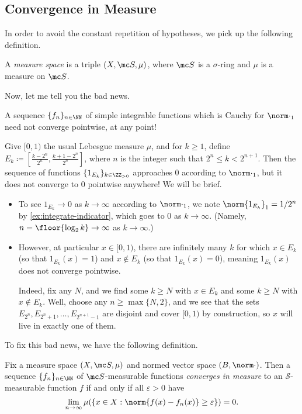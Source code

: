 \documentclass[../notes.tex]{subfiles}
\begin{document}
\subsection{Convergence in Measure}
In order to avoid the constant repetition of hypotheses, we pick up the following definition.
\begin{definition}
	A \textit{measure space} is a triple $(X,\mc S,\mu)$, where $\mc S$ is a $\sigma$-ring and $\mu$ is a measure on $\mc S$.
\end{definition}
Now, let me tell you the bad news.
\begin{warn}
	A sequence $\{f_n\}_{n\in\NN}$ of simple integrable functions which is Cauchy for $\norm\cdot_1$ need not converge pointwise, at any point!
\end{warn}
\begin{example} \label{ex:the-bad-news}
	Give $[0,1)$ the usual Lebesgue measure $\mu$, and for $k\ge1$, define $E_k\coloneqq\left[\frac{k-2^{n}}{2^{n}},\frac{k+1-2^{n}}{2^{n}}\right]$, where $n$ is the integer such that $2^n\le k<2^{n+1}$. Then the sequence of functions $\{1_{E_k}\}_{k\in\ZZ_{>0}}$ approaches $0$ according to $\norm\cdot_1$, but it does not converge to $0$ pointwise anywhere! We will be brief.
	\begin{itemize}
		\item To see $1_{E_k}\to0$ as $k\to\infty$ according to $\norm\cdot_1$, we note $\norm{1_{E_k}}_1=1/2^n$ by \autoref{ex:integrate-indicator}, which goes to $0$ as $k\to\infty$. (Namely, $n=\floor{\log_2k}\to\infty$ as $k\to\infty$.)
		\item However, at particular $x\in[0,1)$, there are infinitely many $k$ for which $x\in E_k$ (so that $1_{E_k}(x)=1$) and $x\notin E_k$ (so that $1_{E_k}(x)=0$), meaning $1_{E_k}(x)$ does not converge pointwise.
		
		Indeed, fix any $N$, and we find some $k\ge N$ with $x\in E_k$ and some $k\ge N$ with $x\notin E_k$. Well, choose any $n\ge\max\{N,2\}$, and we see that the sets $E_{2^n},E_{2^n+1},\ldots,E_{2^{n+1}-1}$ are disjoint and cover $[0,1)$ by construction, so $x$ will live in exactly one of them.
	\end{itemize}
\end{example}
To fix this bad news, we have the following definition.
\begin{definition} \label{def:converge-in-measure}
	Fix a measure space $(X,\mc S,\mu)$ and normed vector space $(B,\norm\cdot)$. Then a sequence $\{f_n\}_{n\in\NN}$ of $\mc S$-measurable functions \textit{converges in measure} to an $\mathcal S$-measurable function $f$ if and only if all $\varepsilon>0$ have
	\[\lim_{n\to\infty}\mu(\{x\in X:\norm{f(x)-f_n(x)}\ge\varepsilon\})=0.\]
\end{definition}
\end{document}
